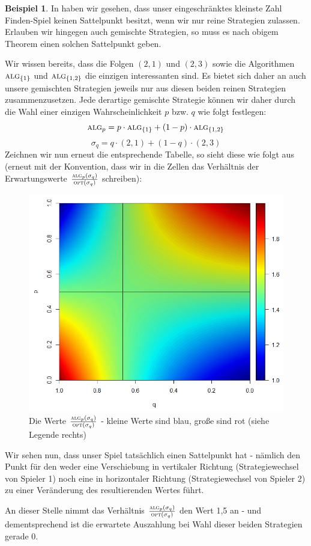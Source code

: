 \documentclass[a4paper,ngerman,12pt,bibtotoc]{scrartcl}
\theoremstyle{definition}
\newtheorem{bsp}[defn]{Beispiel}
\theoremstyle{plain}
\theoremstyle{remark}
\renewcommand{\_}{\mathpunct{.}\,}
\newcommand{\?}{\,{:}\,}
\newcommand{\Alg}{\ensuremath{\textsc{alg}}}
\newcommand{\Opt}{\ensuremath{\textsc{opt}}}
\begin{document}
	\begin{bsp}
		In  haben wir gesehen, dass unser eingeschränktes \glqq kleinste Zahl Finden\grqq{}-Spiel keinen Sattelpunkt besitzt, wenn wir nur reine Strategien zulassen. Erlauben wir hingegen auch gemischte Strategien, so muss es nach obigem Theorem einen solchen Sattelpunkt geben.
		
		Wir wissen bereits, dass die Folgen $(2,1)$ und $(2,3)$ sowie die Algorithmen $\Alg_{\{1\}}$ und $\Alg_{\{1,2\}}$ die einzigen \glqq interessanten\grqq{} sind. Es bietet sich daher an auch unsere gemischten Strategien jeweils nur aus diesen beiden reinen Strategien zusammenzusetzen. Jede derartige gemischte Strategie können wir daher durch die Wahl einer einzigen Wahrscheinlichkeit $p$ bzw. $q$ wie folgt festlegen:
			\[\Alg_p = p\cdot\Alg_{\{1\}} + (1-p)\cdot\Alg_{\{1,2\}}\]
			\[\sigma_q = q\cdot(2,1) + (1-q)\cdot(2,3)\]
		Zeichnen wir nun erneut die entsprechende \glqq Tabelle\grqq{}, so sieht diese wie folgt aus (erneut mit der Konvention, dass wir in die Zellen das Verhältnis der Erwartungswerte $\frac{\Alg_p(\sigma_q)}{\Opt(\sigma_q)}$ schreiben):
		
			\begin{figure}[h]
				\centering
				\includegraphics[width=0.45\linewidth]{../Bilder/Sattelpunkt}
				\caption{\small Die Werte $\frac{\Alg_p(\sigma_q)}{\Opt(\sigma_q)}$ - kleine Werte sind blau, große sind rot (siehe Legende rechts)}
				\label{fig:Sattelpunkt}
			\end{figure}
			
		Wir \glqq sehen\grqq{} nun, dass unser Spiel tatsächlich einen Sattelpunkt hat - nämlich den Punkt für den weder eine Verschiebung in vertikaler Richtung (Strategiewechsel von Spieler 1) noch eine in horizontaler Richtung (Strategiewechsel von Spieler 2) zu einer Veränderung des resultierenden Wertes führt.
		
		An dieser Stelle nimmt das Verhältnis $\frac{\Alg_p(\sigma_q)}{\Opt(\sigma_q)}$ den Wert 1,5 an - und dementsprechend ist die erwartete Auszahlung bei Wahl dieser beiden Strategien gerade 0. 
		

\end{bsp}
\end{document}
